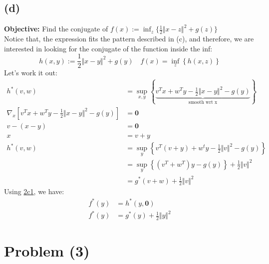 \documentclass[]{article}
\begin{document}
    \subsection*{(d)}
        \textbf{Objective: }Find the conjugate of $f(x):= \inf_z \{
            \frac{1}{2}\Vert x - z\Vert^2 + g(z)
        \}$
        \\
        Notice that, the expression fits the pattern described in (c), and therefore, we are interested in looking for the conjugate of the function inside the inf: 
        $$
        h(x, y) := \frac{1}{2} \Vert x - y\Vert^2 + g(y) \quad f(x) = \inf_z \left\lbrace
            h(x, z)
        \right\rbrace
        $$
        Let's work it out: 
        \begin{align*}\tag{2d1}\label{eqn:2d1}
            h^*(v, w) &= \sup_{x, y} \left\lbrace
                \underbrace{v^Tx + w^Ty - \frac{1}{2}\Vert x - y\Vert^2 - g(y)}_\text{smooth wrt x}
            \right\rbrace
            \\
            \nabla_x \left[ 
                v^Tx + w^Ty - \frac{1}{2}\Vert x - y\Vert^2 - g(y)
            \right] &= \mathbf{0}
            \\
            v - (x - y) &= \mathbf{0}
            \\
            x &= v + y
            \\
            h^*(v, w) &= \sup_y \left\lbrace
                v^T(v + y) + w^t y - \frac{1}{2} \Vert v\Vert^2 - g(y)
            \right\rbrace
            \\
            &=
            \sup_y \left\lbrace
                (v^T + w^T)y - g(y)
            \right\rbrace + \frac{1}{2}\Vert v \Vert^2
            \\
            &= g^*(v + w) + \frac{1}{2} \Vert v\Vert^2
        \end{align*}
        Using \hyperref[eqn:2c1]{2c1}, we have: 
        \begin{align*}\tag{2d2}\label{eqn:2d2}
            f^*(y) &= h^*(y, \mathbf{0}) 
            \\
            f^*(y) &= g^*(y) + \frac{1}{2}\Vert y\Vert^2
        \end{align*}
\section*{Problem (3)}
\end{document}
